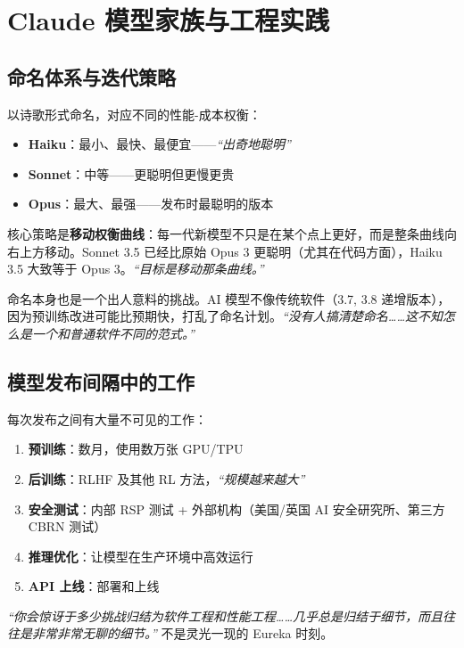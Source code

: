 \section{Claude 模型家族与工程实践}

\subsection{命名体系与迭代策略}

以诗歌形式命名，对应不同的性能-成本权衡：
\begin{itemize}
    \item \textbf{Haiku}：最小、最快、最便宜——\textit{``出奇地聪明''}
    \item \textbf{Sonnet}：中等——更聪明但更慢更贵
    \item \textbf{Opus}：最大、最强——发布时最聪明的版本
\end{itemize}

核心策略是\textbf{移动权衡曲线}：每一代新模型不只是在某个点上更好，而是整条曲线向右上方移动。Sonnet 3.5 已经比原始 Opus 3 更聪明（尤其在代码方面），Haiku 3.5 大致等于 Opus 3。\textit{``目标是移动那条曲线。''}

命名本身也是一个出人意料的挑战。AI 模型不像传统软件（3.7, 3.8 递增版本），因为预训练改进可能比预期快，打乱了命名计划。\textit{``没有人搞清楚命名……这不知怎么是一个和普通软件不同的范式。''}

\subsection{模型发布间隔中的工作}

每次发布之间有大量不可见的工作：

\begin{enumerate}
    \item \textbf{预训练}：数月，使用数万张 GPU/TPU
    \item \textbf{后训练}：RLHF 及其他 RL 方法，\textit{``规模越来越大''}
    \item \textbf{安全测试}：内部 RSP 测试 + 外部机构（美国/英国 AI 安全研究所、第三方 CBRN 测试）
    \item \textbf{推理优化}：让模型在生产环境中高效运行
    \item \textbf{API 上线}：部署和上线
\end{enumerate}

\textit{``你会惊讶于多少挑战归结为软件工程和性能工程……几乎总是归结于细节，而且往往是非常非常无聊的细节。''} 不是灵光一现的 Eureka 时刻。

